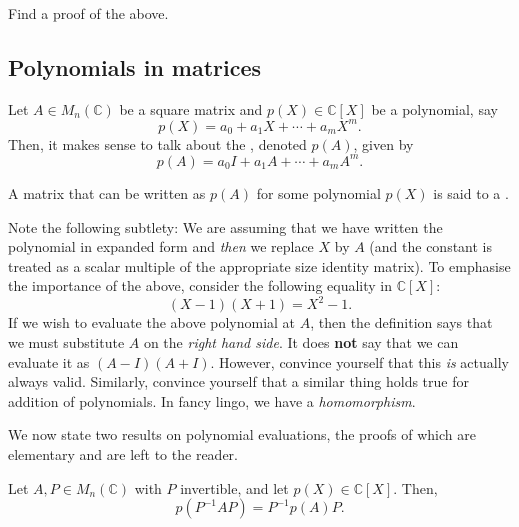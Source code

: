 \documentclass[12pt]{article}
\begin{document}
\begin{exe}
	Find a proof of the above. 
\end{exe}

\subsection{Polynomials in matrices}

Let $A \in M_{n}(\mathbb{C})$ be a square matrix and $p(X) \in \mathbb{C}[X]$ be a polynomial, say
\begin{equation*} 
	p(X) = a_{0} + a_{1} X + \cdots + a_{m} X^{m}.
\end{equation*}
Then, it makes sense to talk about the , denoted $p(A)$, given by
\begin{equation*} 
	p(A) = a_{0} I + a_{1} A + \cdots + a_{m} A^{m}.
\end{equation*}

A matrix that can be written as $p(A)$ for some polynomial $p(X)$ is said to a .

Note the following subtlety: We are assuming that we have written the polynomial in expanded form and \emph{then} we replace $X$ by $A$ (and the constant is treated as a scalar multiple of the appropriate size identity matrix). \newline
To emphasise the importance of the above, consider the following equality in $\mathbb{C}[X]$:
\begin{equation*} 
	(X - 1)(X + 1) = X^{2} - 1.
\end{equation*}
If we wish to evaluate the above polynomial at $A$, then the definition says that we must substitute $A$ on the \emph{right hand side}. It does \textbf{not} say that we can evaluate it as $(A - I)(A + I)$. However, convince yourself that this \emph{is} actually always valid. Similarly, convince yourself that a similar thing holds true for addition of polynomials. \newline
In fancy lingo, we have a \emph{homomorphism}. 

We now state two results on polynomial evaluations, the proofs of which are elementary and are left to the reader.

\begin{thm} \label{thm:similar-polynomial-evaluation}
	Let $A, P \in M_{n}(\mathbb{C})$ with $P$ invertible, and let $p(X) \in \mathbb{C}[X]$. Then,
	\begin{equation*} 
		p(P^{-1} A P) = P^{-1} p(A) P.
	\end{equation*}
\end{thm}
\end{document}
